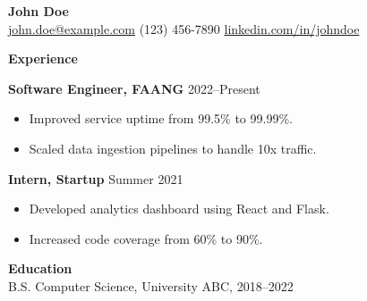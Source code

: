 \documentclass[a4paper,10pt]{article}
\begin{document}
{\huge \textbf{John Doe}} \\
\href{mailto:john.doe@example.com}{john.doe@example.com} \textbar{} (123) 456-7890 \textbar{} \href{https://linkedin.com/in/johndoe}{linkedin.com/in/johndoe}

\vspace{5pt}

\textbf{Experience}

\textbf{Software Engineer, FAANG} \hfill 2022--Present \\
\begin{itemize}
    \item Improved service uptime from 99.5\% to 99.99\%.
    \item Scaled data ingestion pipelines to handle 10x traffic.
\end{itemize}

\textbf{Intern, Startup} \hfill Summer 2021 \\
\begin{itemize}
    \item Developed analytics dashboard using React and Flask.
    \item Increased code coverage from 60\% to 90\%.
\end{itemize}

\vspace{5pt}

\textbf{Education}\\
B.S. Computer Science, University ABC, 2018--2022
\end{document}
